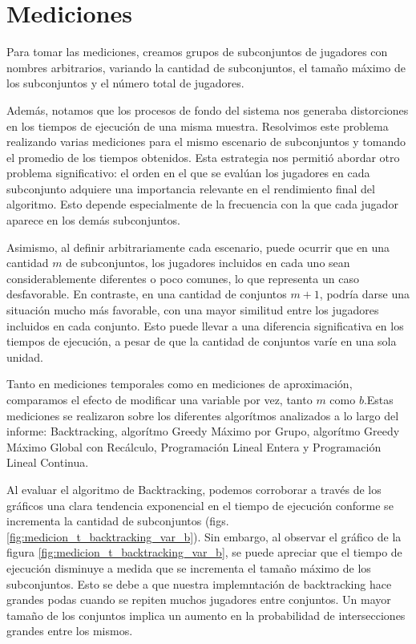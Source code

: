 \section{Mediciones}

Para tomar las mediciones, creamos grupos de subconjuntos de jugadores con nombres arbitrarios, variando la cantidad de subconjuntos, el tamaño máximo de los subconjuntos y el número total de jugadores.

Además, notamos que los procesos de fondo del sistema nos generaba distorciones en los tiempos de ejecución de una misma muestra. Resolvimos este problema realizando varias mediciones para el mismo escenario de subconjuntos y tomando el promedio de los tiempos obtenidos. Esta estrategia nos permitió abordar otro problema significativo: el orden en el que se evalúan los jugadores en cada subconjunto adquiere una importancia relevante en el rendimiento final del algoritmo. Esto depende especialmente de la frecuencia con la que cada jugador aparece en los demás subconjuntos. 

Asimismo, al definir arbitrariamente cada escenario, puede ocurrir que en una cantidad 
$m$ de subconjuntos, los jugadores incluidos en cada uno sean considerablemente diferentes o poco comunes, lo que representa un caso desfavorable. En contraste, en una cantidad de conjuntos $m+1$, podría darse una situación mucho más favorable, con una mayor similitud entre los jugadores incluidos en cada conjunto. Esto puede llevar a una diferencia significativa en los tiempos de ejecución, a pesar de que la cantidad de conjuntos varíe en una sola unidad.

Tanto en mediciones temporales como en mediciones de aproximación, comparamos el efecto de modificar una variable por vez, tanto $m$ como $b$.Estas mediciones se realizaron sobre los diferentes algorítmos analizados a lo largo del informe: Backtracking, algorítmo Greedy Máximo por Grupo, algorítmo Greedy Máximo Global con Recálculo, Programación Lineal Entera y Programación Lineal Continua.

Al evaluar el algoritmo de Backtracking, podemos corroborar a través de los gráficos una clara tendencia exponencial en el tiempo de ejecución conforme se incrementa la cantidad de subconjuntos (figs. \ref{fig:medicion_t_backtracking_var_b}). Sin embargo, al observar el gráfico de la figura \ref{fig:medicion_t_backtracking_var_b}, se puede apreciar que el tiempo de ejecución disminuye a medida que se incrementa el tamaño máximo de los subconjuntos. Esto se debe a que nuestra implemntación de backtracking hace grandes podas cuando se repiten muchos jugadores entre conjuntos. Un mayor tamaño de los conjuntos implica un aumento en la probabilidad de intersecciones grandes entre los mismos.


